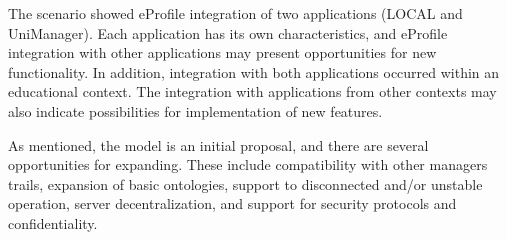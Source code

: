 \documentclass[preprint,authoryear,12pt,dvipdfm]{elsarticle}
\begin{document}
The scenario showed eProfile integration of two applications (LOCAL and UniManager). Each application has its own characteristics, and eProfile integration with other applications may present opportunities for new functionality. In addition, integration with both applications occurred within an educational context. The integration with applications from other contexts may also indicate possibilities for implementation of new features.

As mentioned, the model is an initial proposal, and there are several opportunities for expanding. These include compatibility with other managers trails, expansion of basic ontologies, support to disconnected and/or unstable operation, server decentralization, and support for security protocols and confidentiality.




\end{document}
